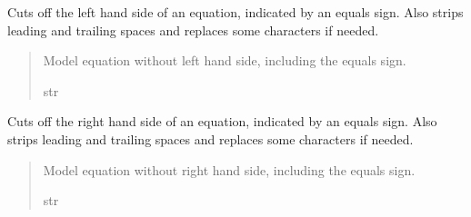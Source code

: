 \documentclass[letterpaper,10pt,english]{sphinxmanual}
\begin{document}
\begin{fulllineitems}
\begin{fulllineitems}
\end{fulllineitems}


\begin{fulllineitems}
\label{\detokenize{VPCModel:src.VPCModel.VPCModel.cut_off_lhs}}
\pysigstartsignatures
{}
\pysigstopsignatures
\sphinxAtStartPar
Cuts off the left hand side of an equation, indicated by an equals sign.
Also strips leading and trailing spaces and replaces some characters if needed.
\begin{quote}\begin{description}
\sphinxAtStartPar
Model equation without left hand side, including the equals sign.

\sphinxAtStartPar
str

\end{description}\end{quote}

\end{fulllineitems}


\begin{fulllineitems}
\label{\detokenize{VPCModel:src.VPCModel.VPCModel.cut_off_rhs}}
\pysigstartsignatures
{}
\pysigstopsignatures
\sphinxAtStartPar
Cuts off the right hand side of an equation, indicated by an equals sign.
Also strips leading and trailing spaces and replaces some characters if needed.
\begin{quote}\begin{description}
\sphinxAtStartPar
Model equation without right hand side, including the equals sign.

\sphinxAtStartPar
str

\end{description}\end{quote}

\end{fulllineitems}



\end{fulllineitems}
\end{document}
